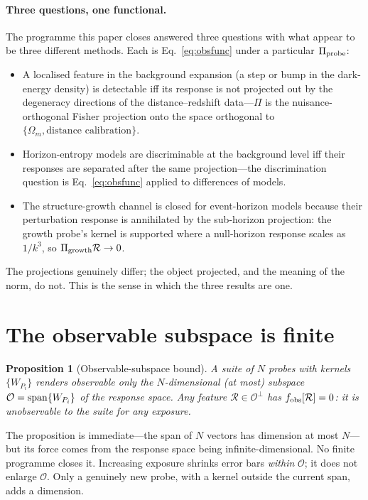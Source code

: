 \documentclass[twocolumn,10pt]{article}
\newtheorem{proposition}{Proposition}
\newcommand{\obs}{f_{\rm obs}}
\begin{document}
\paragraph{Three questions, one functional.}
The programme this paper closes answered three questions with what appear to be
three different methods. Each is Eq.~\eqref{eq:obsfunc} under a particular
$\Pi_{\rm probe}$:
\begin{itemize}\itemsep2pt
\item A localised feature in the background expansion (a step or bump in the
dark-energy density) is detectable iff its response is not projected out by the
degeneracy directions of the distance--redshift data---$\Pi$ is the
nuisance-orthogonal Fisher projection onto the space orthogonal to
$\{\Omega_m,\text{distance calibration}\}$.
\item Horizon-entropy models are discriminable at the background level iff their
responses are separated after the same projection---the discrimination question
is Eq.~\eqref{eq:obsfunc} applied to differences of models.
\item The structure-growth channel is closed for event-horizon models because
their perturbation response is annihilated by the sub-horizon projection: the
growth probe's kernel is supported where a null-horizon response scales as
$1/k^3$, so $\Pi_{\rm growth}\mathcal{R}\to0$.
\end{itemize}
The projections genuinely differ; the object projected, and the meaning of the
norm, do not. This is the sense in which the three results are one.

\section{The observable subspace is finite}
\label{sec:finite}

\begin{proposition}[Observable-subspace bound]
\label{prop:finite}
A suite of $N$ probes with kernels $\{W_{P_i}\}$ renders observable only the
$N$-dimensional (at most) subspace $\mathcal{O}={\rm span}\{W_{P_i}\}$ of the
response space. Any feature $\mathcal{R}\in\mathcal{O}^\perp$ has
$\obs[\mathcal{R}]=0$: it is unobservable to the suite for any exposure.
\end{proposition}

The proposition is immediate---the span of $N$ vectors has dimension at most
$N$---but its force comes from the response space being infinite-dimensional.
No finite programme closes it. Increasing exposure shrinks error bars
\emph{within} $\mathcal{O}$; it does not enlarge $\mathcal{O}$. Only a
genuinely new probe, with a kernel outside the current span, adds a dimension.
\end{document}
